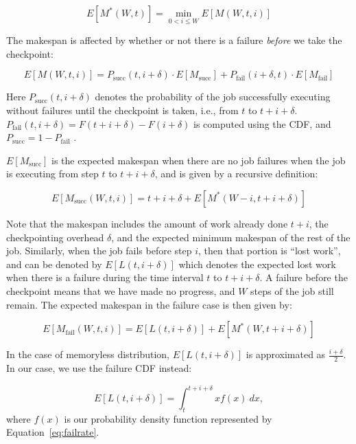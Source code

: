\begin{equation}
  \label{eq:m0}
  E[M^*(W, t)] = \min_{0<i\leq W}{E[M(W, t, i)]}
\end{equation}

The makespan is affected by whether or not there is a failure \emph{before} we take the checkpoint: 

\begin{equation}
  \label{eq:m1}
E[M(W, t, i)] = P_{\text{succ}}(t, i+\delta) \cdot E[M_{\text{succ}}] + P_{\text{fail}}(i+\delta, t) \cdot E[M_{\text{fail}}]
\end{equation}

Here $P_{\text{succ}}(t, i+\delta)$ denotes the probability of the job successfully executing without failures until the checkpoint is taken, i.e., from $t$ to $t+i+\delta$. $P_{\text{fail}}(t, i+\delta) = F(t+i+\delta)-F(i+\delta)$ is computed using the CDF, 
and $P_{\text{succ}} = 1 - P_{\text{fail}}$ .



$E[M_{\text{succ}}]$ is the expected makespan when there are no job failures when the job is executing from step $t$ to $t+i+\delta$, and is given by a recursive definition:

\begin{equation}
  \label{eq:msuc}
E[M_{\text{succ}}(W, t, i)] = t+i+\delta + E[M^*(W-i, t+i+\delta)]  
\end{equation}

\noindent Note that the makespan includes the amount of work already done $t+i$, the checkpointing overhead $\delta$, and the expected minimum makespan of the rest of the job.
Similarly, when the job fails before step $i$, then that portion is ``lost work'', and can be denoted by $E[L(t, i+\delta)]$ which denotes the expected lost work when there is a failure during the time interval $t$ to $t+i+\delta$.
A failure before the checkpoint means that we have made no progress, and $W$ steps of the job still remain.
The expected makespan in the failure case is then given by:

\begin{equation}
  \label{eq:mfail}
 E[M_{\text{fail}}(W, t, i)] = E[L(t, i+\delta)] + E[M^*(W, t+i+\delta)]
\end{equation}



In the case of memoryless distribution, $E[L(t, i+\delta)]$ is approximated as $\frac{i+\delta}{2}$.
In our case, we use the failure CDF instead:

\begin{equation}
  \label{eq:exploss}
E[L(t, i+\delta)] = \int_{t}^{t+i+\delta}{xf(x)~dx}   , 
\end{equation}
where $f(x)$ is our probability density function represented by Equation~\ref{eq:failrate}.

